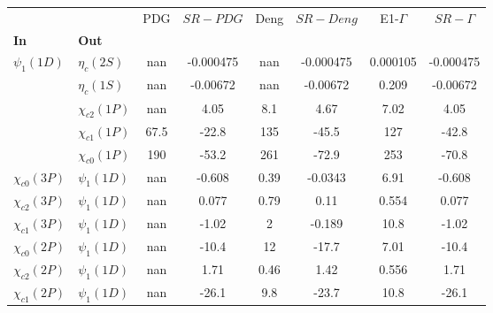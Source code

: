 \begin{tabular}{l|l|c|c|c|c|c|c}
\toprule
                &                &  PDG &  $SR-PDG$ &  Deng & $SR-Deng$ &  E1-$\Gamma$ & $SR-\Gamma$ \\
\textbf{In} & \textbf{Out} &      &           &       &           &              &             \\
\midrule
\textbf{$\psi_{1}(1D)$} & \textbf{$\eta_{c}(2S)$} &  nan & -0.000475 &   nan & -0.000475 &     0.000105 &   -0.000475 \\
                & \textbf{$\eta_{c}(1S)$} &  nan &  -0.00672 &   nan &  -0.00672 &        0.209 &    -0.00672 \\
                & \textbf{$\chi_{c2}(1P)$} &  nan &      4.05 &   8.1 &      4.67 &         7.02 &        4.05 \\
                & \textbf{$\chi_{c1}(1P)$} & 67.5 &     -22.8 &   135 &     -45.5 &          127 &       -42.8 \\
                & \textbf{$\chi_{c0}(1P)$} &  190 &     -53.2 &   261 &     -72.9 &          253 &       -70.8 \\
\textbf{$\chi_{c0}(3P)$} & \textbf{$\psi_{1}(1D)$} &  nan &    -0.608 &  0.39 &   -0.0343 &         6.91 &      -0.608 \\
\textbf{$\chi_{c2}(3P)$} & \textbf{$\psi_{1}(1D)$} &  nan &     0.077 &  0.79 &      0.11 &        0.554 &       0.077 \\
\textbf{$\chi_{c1}(3P)$} & \textbf{$\psi_{1}(1D)$} &  nan &     -1.02 &     2 &    -0.189 &         10.8 &       -1.02 \\
\textbf{$\chi_{c0}(2P)$} & \textbf{$\psi_{1}(1D)$} &  nan &     -10.4 &    12 &     -17.7 &         7.01 &       -10.4 \\
\textbf{$\chi_{c2}(2P)$} & \textbf{$\psi_{1}(1D)$} &  nan &      1.71 &  0.46 &      1.42 &        0.556 &        1.71 \\
\textbf{$\chi_{c1}(2P)$} & \textbf{$\psi_{1}(1D)$} &  nan &     -26.1 &   9.8 &     -23.7 &         10.8 &       -26.1 \\
\bottomrule
\end{tabular}
